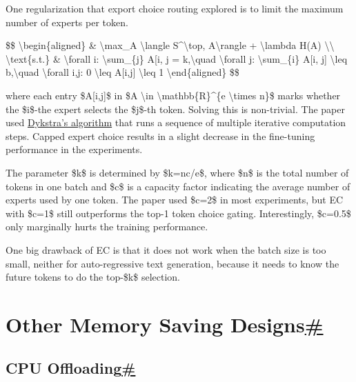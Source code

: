One regularization that export choice routing explored is to limit the maximum number of experts per token.

\$\$ \textbackslash begin\{aligned\} \& \textbackslash max\_A \textbackslash langle S\^{}\textbackslash top, A\textbackslash rangle + \textbackslash lambda H(A) \textbackslash\textbackslash{} \textbackslash text\{s.t.\} \& \textbackslash forall i: \textbackslash sum\_\{j\textquotesingle\} A{[}i, j\textquotesingle{]} = k,\textbackslash quad \textbackslash forall j: \textbackslash sum\_\{i\textquotesingle\} A{[}i\textquotesingle, j{]} \textbackslash leq b,\textbackslash quad \textbackslash forall i,j: 0 \textbackslash leq A{[}i,j{]} \textbackslash leq 1 \textbackslash end\{aligned\} \$\$

where each entry \$A{[}i,j{]}\$ in \$A \textbackslash in \textbackslash mathbb\{R\}\^{}\{e \textbackslash times n\}\$ marks whether the \$i\$-the expert selects the \$j\$-th token. Solving this is non-trivial. The paper used \href{https://projecteuclid.org/journals/annals-of-probability/volume-13/issue-3/An-Iterative-Procedure-for-Obtaining-I-Projections-onto-the-Intersection/10.1214/aop/1176992918.full}{Dykstra's algorithm} that runs a sequence of multiple iterative computation steps. Capped expert choice results in a slight decrease in the fine-tuning performance in the experiments.

The parameter \$k\$ is determined by \$k=nc/e\$, where \$n\$ is the total number of tokens in one batch and \$c\$ is a capacity factor indicating the average number of experts used by one token. The paper used \$c=2\$ in most experiments, but EC with \$c=1\$ still outperforms the top-1 token choice gating. Interestingly, \$c=0.5\$ only marginally hurts the training performance.

One big drawback of EC is that it does not work when the batch size is too small, neither for auto-regressive text generation, because it needs to know the future tokens to do the top-\$k\$ selection.

\section{\texorpdfstring{Other Memory Saving Designs\hyperref[other-memory-saving-designs]{\#}}{Other Memory Saving Designs\#}}\label{other-memory-saving-designs}

\subsection{\texorpdfstring{CPU Offloading\hyperref[cpu-offloading]{\#}}{CPU Offloading\#}}\label{cpu-offloading}

